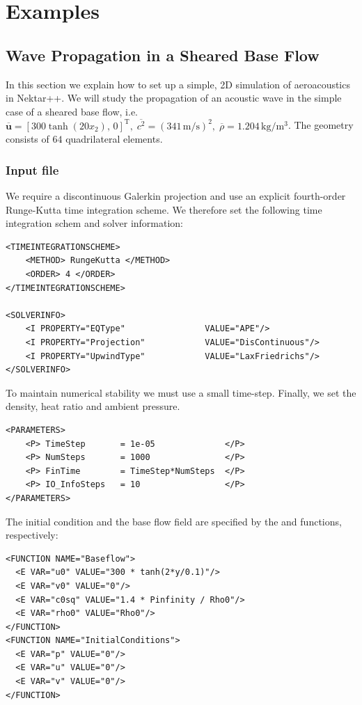\section{Examples}
\subsection{Wave Propagation in a Sheared Base Flow}
In this section we explain how to set up a simple, 2D simulation of aeroacoustics in
Nektar++. We will study the propagation of an acoustic wave in the simple case
of a sheared base flow, i.e. $\overline{\boldsymbol{u}} = \left[300  \tanh(20
x_2),\, 0\right]^{\mathrm{T}}, \; \overline{c^2}=\left(341\, \mathrm{m}/\mathrm{s}\right)^2, \; \overline{\rho} = 1.204\, \mathrm{kg}/\mathrm{m}^3$. The geometry consists
of $64$ quadrilateral elements.

\subsubsection{Input file}
We require a discontinuous Galerkin projection and use an explicit
fourth-order Runge-Kutta time integration scheme. We therefore set the
following time integration schem and solver information:
\begin{lstlisting}[style=XmlStyle]
<TIMEINTEGRATIONSCHEME>
    <METHOD> RungeKutta </METHOD>
    <ORDER> 4 </ORDER>
</TIMEINTEGRATIONSCHEME>

<SOLVERINFO>
    <I PROPERTY="EQType"                VALUE="APE"/>
    <I PROPERTY="Projection"            VALUE="DisContinuous"/>
    <I PROPERTY="UpwindType"            VALUE="LaxFriedrichs"/>
</SOLVERINFO>
\end{lstlisting}

To maintain numerical stability we must use a small time-step.
Finally, we set the density, heat ratio and ambient pressure.
\begin{lstlisting}[style=XMLStyle]
<PARAMETERS>
    <P> TimeStep       = 1e-05              </P>
    <P> NumSteps       = 1000               </P>
    <P> FinTime        = TimeStep*NumSteps  </P>
    <P> IO_InfoSteps   = 10                 </P>
</PARAMETERS>
\end{lstlisting}

The initial condition and the base flow field are specified by the   and   functions, respectively:
\begin{lstlisting}[style=XMLStyle]
<FUNCTION NAME="Baseflow">
  <E VAR="u0" VALUE="300 * tanh(2*y/0.1)"/>
  <E VAR="v0" VALUE="0"/>
  <E VAR="c0sq" VALUE="1.4 * Pinfinity / Rho0"/>
  <E VAR="rho0" VALUE="Rho0"/>
</FUNCTION>
<FUNCTION NAME="InitialConditions">
  <E VAR="p" VALUE="0"/>
  <E VAR="u" VALUE="0"/>
  <E VAR="v" VALUE="0"/>
</FUNCTION>
\end{lstlisting}

